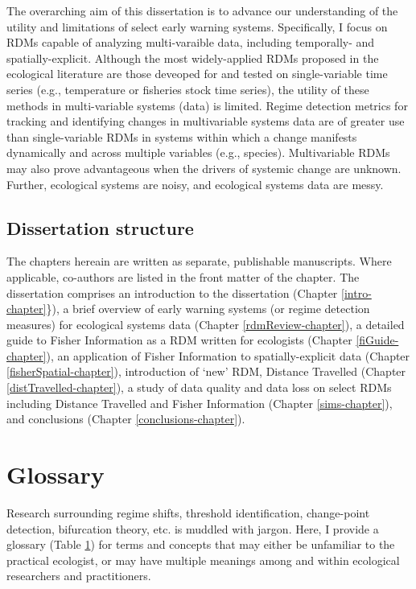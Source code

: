 \documentclass[12pt,twoside,openany]{reedthesis}
\begin{document}
The overarching aim of this dissertation is to advance our understanding
of the utility and limitations of select early warning systems.
Specifically, I focus on RDMs capable of analyzing multi-varaible data,
including temporally- and spatially-explicit. Although the most
widely-applied RDMs proposed in the ecological literature are those
deveoped for and tested on single-variable time series (e.g.,
temperature or fisheries stock time series), the utility of these
methods in multi-variable systems (data) is limited. Regime detection
metrics for tracking and identifying changes in multivariable systems
data are of greater use than single-variable RDMs in systems within
which a change manifests dynamically and across multiple variables
(e.g., species). Multivariable RDMs may also prove advantageous when the
drivers of systemic change are unknown. Further, ecological systems are
noisy, and ecological systems data are messy.

\subsection{Dissertation structure}\label{dissertation-structure}

The chapters hereain are written as separate, publishable manuscripts.
Where applicable, co-authors are listed in the front matter of the
chapter. The dissertation comprises an introduction to the dissertation
(Chapter \ref{intro-chapter}\}), a brief overview of early warning
systems (or regime detection measures) for ecological systems data
(Chapter \ref{rdmReview-chapter}), a detailed guide to Fisher
Information as a RDM written for ecologists (Chapter
\ref{fiGuide-chapter}), an application of Fisher Information to
spatially-explicit data (Chapter \ref{fisherSpatial-chapter}),
introduction of `new' RDM, Distance Travelled (Chapter
\ref{distTravelled-chapter}), a study of data quality and data loss on
select RDMs including Distance Travelled and Fisher Information (Chapter
\ref{sims-chapter}), and conclusions (Chapter
\ref{conclusions-chapter}).

\section{Glossary}\label{glossary}

Research surrounding regime shifts, threshold identification,
change-point detection, bifurcation theory, etc. is muddled with jargon.
Here, I provide a glossary (Table \ref{glossary}) for terms and concepts
that may either be unfamiliar to the practical ecologist, or may have
multiple meanings among and within ecological researchers and
practitioners.
\end{document}
